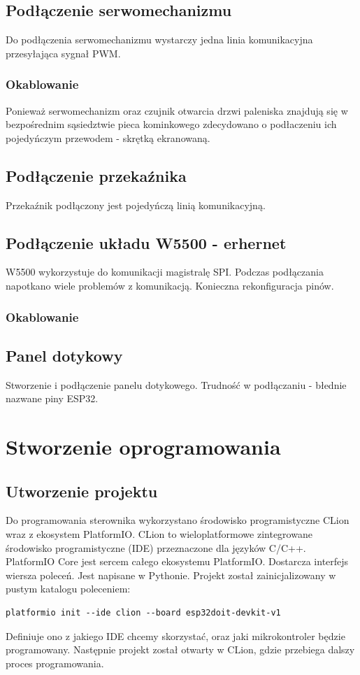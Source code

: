 \documentclass[12pt]{report}
\begin{document}
 \section{Podłączenie serwomechanizmu}
 Do podłączenia serwomechanizmu wystarczy jedna linia komunikacyjna przesyłająca sygnał PWM.
 \subsection{Okablowanie}
 Ponieważ serwomechanizm oraz czujnik otwarcia drzwi paleniska znajdują się w bezpośrednim sąsiedztwie pieca kominkowego zdecydowano o podłaczeniu ich pojedyńczym przewodem - skrętką ekranowaną.
 
 \section{Podłączenie przekaźnika}
 Przekaźnik podłączony jest pojedyńczą linią komunikacyjną.
 
  \section{Podłączenie układu W5500 - erhernet}
 W5500 wykorzystuje do komunikacji magistralę SPI.
 Podczas podłączania napotkano wiele problemów z komunikacją.
 Konieczna rekonfiguracja pinów.
 \subsection{Okablowanie}
 
 
 \section{Panel dotykowy}
 Stworzenie i podłączenie panelu dotykowego.
 Trudność w podłączaniu - błednie nazwane piny ESP32.
 
 \chapter{Stworzenie oprogramowania}\label{rozdz.stworzenie}
 
 \section{Utworzenie projektu}
 Do programowania sterownika wykorzystano środowisko programistyczne CLion wraz z ekosystem PlatformIO.
 CLion to wieloplatformowe zintegrowane środowisko programistyczne (IDE) przeznaczone dla języków C/C++.
 PlatformIO Core jest sercem całego ekosystemu PlatformIO. Dostarcza interfejs wiersza poleceń. Jest napisane w Pythonie.
 Projekt został zainicjalizowany w pustym katalogu poleceniem:
 \begin{lstlisting}
platformio init --ide clion --board esp32doit-devkit-v1 
 \end{lstlisting}
 Definiuje ono z jakiego IDE chcemy skorzystać, oraz jaki mikrokontroler będzie programowany.
 Następnie projekt został otwarty w CLion, gdzie przebiega dalszy proces programowania.
 
\end{document}
